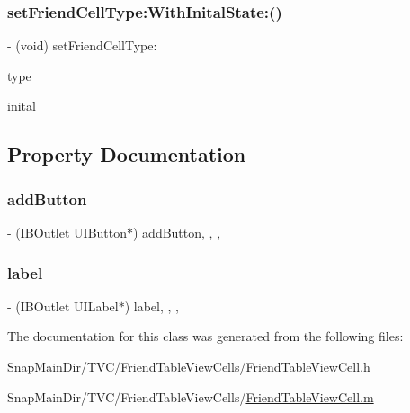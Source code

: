 \subsubsection{\texorpdfstring{set\+Friend\+Cell\+Type\+:\+With\+Inital\+State\+:()}{setFriendCellType:WithInitalState:()}}
{\footnotesize\ttfamily -\/ (void) set\+Friend\+Cell\+Type\+: \begin{DoxyParamCaption}\item[{(int)}]{type }\item[{WithInitalState:(B\+O\+OL)}]{inital }\end{DoxyParamCaption}}



\subsection{Property Documentation}
\hypertarget{interface_friend_table_view_cell_a1320a6103138b9ea5240e30caa97eb32}{}\label{interface_friend_table_view_cell_a1320a6103138b9ea5240e30caa97eb32} 
\subsubsection{\texorpdfstring{add\+Button}{addButton}}
{\footnotesize\ttfamily -\/ (I\+B\+Outlet U\+I\+Button$\ast$) add\+Button\hspace{0.3cm}{\ttfamily [read]}, {\ttfamily [write]}, {\ttfamily [nonatomic]}, {\ttfamily [weak]}}

\hypertarget{interface_friend_table_view_cell_ac6db166c2169fda84494a2689dd1955e}{}\label{interface_friend_table_view_cell_ac6db166c2169fda84494a2689dd1955e} 
\subsubsection{\texorpdfstring{label}{label}}
{\footnotesize\ttfamily -\/ (I\+B\+Outlet U\+I\+Label$\ast$) label\hspace{0.3cm}{\ttfamily [read]}, {\ttfamily [write]}, {\ttfamily [nonatomic]}, {\ttfamily [weak]}}



The documentation for this class was generated from the following files\+:\begin{DoxyCompactItemize}
\item 
Snap\+Main\+Dir/\+T\+V\+C/\+Friend\+Table\+View\+Cells/\hyperlink{_friend_table_view_cell_8h}{Friend\+Table\+View\+Cell.\+h}\item 
Snap\+Main\+Dir/\+T\+V\+C/\+Friend\+Table\+View\+Cells/\hyperlink{_friend_table_view_cell_8m}{Friend\+Table\+View\+Cell.\+m}\end{DoxyCompactItemize}
